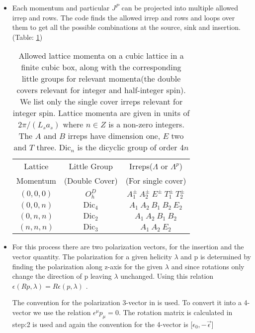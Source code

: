\documentclass[10pt]{article}
\begin{document}
\begin{itemize}
	\item Each momentum and particular $J^P$  can be projected into multiple allowed irrep and rows. The code finds the allowed irrep and rows and loops over them to get all the possible combinations at the source, sink and insertion. (Table: \ref{irrep_table})

\begin{table}[!htbp]
\centering
\hspace{9mm}
\begin{minipage}{0.5\linewidth}
\begin{tabular}{c|c|c}

Lattice & Little Group & Irreps($\Lambda$ or $\Lambda^p$) \\ 
Momentum & (Double Cover) & (For single cover)\\

\hline

$(0,0,0)$ & $O^{D}_h$ & $A_1^{\pm} \ A_2^{\pm} \ E^{\pm} \ T_1^{\pm} \ T_2^{\pm}$\\ 
$(0,0,n)$ & $\mbox{Dic}_4$ & $A_1 \ A_2 \ B_1 \ B_2 \ E_2 $\\
$(0,n,n)$ & $\mbox{Dic}_2$ & $A_1 \ A_2 \ B_1 \ B_2 $\\
$(n,n,n)$ & $\mbox{Dic}_3$ & $A_1 \ A_2 \ E_2 $\\

\end{tabular}
\end{minipage}
\caption{Allowed lattice momenta on a cubic lattice in a finite cubic box, along with the corresponding little groups for relevant momenta(the double covers relevant for integer and half-integer spin). We list only the single cover irreps relevant for integer spin. Lattice momenta are given in units of $2\pi/(L_s a_s )$ where $n \in Z$  is a non-zero integers. The $A$ and $B$ irreps have dimension one, $E$ two
and $T$ three. Dic$_{n}$ is the dicyclic group of order 4$n$}
\label{irrep_table}
\end{table}


	\item For this process there are two polarization vectors, for the insertion and the vector quantity. The polarization for a given helicity $\lambda$ and p is determined by finding the polarization along z-axis for the given $\lambda$ and since rotations only change the direction of p leaving $\lambda$ unchanged. Using this relation $\epsilon(Rp, \lambda) = R\epsilon(p,\lambda)$ \cite{hel}. \par The convention for the polarization 3-vector in \cite{hel} is used. To convert it into a 4-vector we use the relation $\epsilon^{\mu}p_{\mu} = 0$. The rotation matrix is calculated in step:2 is used and again the convention for the 4-vector is [$\epsilon_0,-\vec{\epsilon}$]


\end{itemize}
\end{document}
